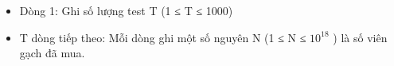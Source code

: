 \begin{itemize}
	\item Dòng 1: Ghi số lượng test T (1 ≤ T ≤ 1000)
	\item T dòng tiếp theo: Mỗi dòng ghi một số nguyên N (1 ≤ N ≤ $10^{18}$ ) là số viên gạch đã mua.
\end{itemize}